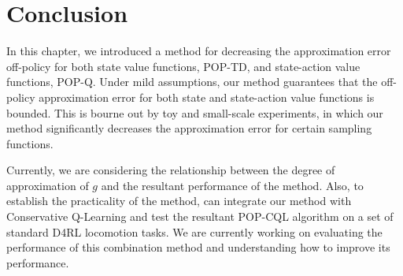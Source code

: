 \section{Conclusion}
In this chapter, we introduced a method for decreasing the approximation error off-policy for both state value functions, POP-TD, and state-action value functions, POP-Q. Under mild assumptions, our method guarantees that the off-policy approximation error for both state and state-action value functions is bounded. This is bourne out by toy and small-scale experiments, in which our method significantly decreases the approximation error for certain sampling functions.

Currently, we are considering the relationship between the degree of approximation of $g$ and the resultant performance of the method. Also, to establish the practicality of the method, can integrate our method with Conservative Q-Learning and test the resultant POP-CQL algorithm on a set of standard D4RL locomotion tasks. We are currently working on evaluating the performance of this combination method and understanding how to improve its performance.
